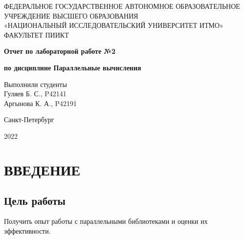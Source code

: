 \documentclass[14pt, a4paper, oneside, final]{extarticle}
\begin{document}
 
\setcounter{page}{0}
\begin{center} 
\small
\footnotesize{ФЕДЕРАЛЬНОЕ ГОСУДАРСТВЕННОЕ АВТОНОМНОЕ ОБРАЗОВАТЕЛЬНОЕ}\\
\footnotesize{УЧРЕЖДЕНИЕ ВЫСШЕГО ОБРАЗОВАНИЯ}\\ 
\footnotesize{«НАЦИОНАЛЬНЫЙ ИССЛЕДОВАТЕЛЬСКИЙ УНИВЕРСИТЕТ ИТМО»}\\
\hfill \break 
\footnotesize{ФАКУЛЬТЕТ ПИИКТ}\\
\hfill \break
\hfill \break 
\hfill \break
\large{
    \textbf{Отчет по лабораторной работе №2}

    \textbf{по дисциплине Параллельные вычисления}
}

\hfill \break 
\end{center} 
\begin{flushright} 
Выполнили студенты\\
Гуляев Б. С., P42141\\
Аргынова К. А., P42191\\
\end{flushright}
\vspace*{\fill}
\begin{center}
Санкт-Петербург

2022
\end{center}
\normalsize
\thispagestyle{empty} 
\clearpage
\def\contentsname{ОГЛАВЛЕНИЕ}
\tableofcontents 

\clearpage
\section*{ВВЕДЕНИЕ}
\subsection*{Цель работы}
Получить опыт работы с параллельными библиотеками и оценки их эффективности.
\end{document}
